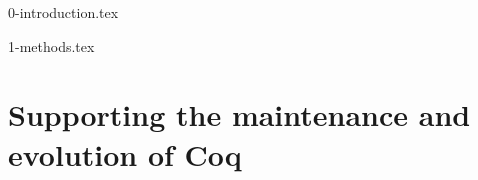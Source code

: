\documentclass[a4paper,11pt,openbib]{memoir} %
\newcommand{\clearemptydoublepage}{\newpage{\thispagestyle{empty}\cleardoublepage}}
\theoremstyle{plain}
\theoremstyle{plain}
\theoremstyle{plain}
\theoremstyle{definition}
\theoremstyle{plain}
\theoremstyle{plain}
\theoremstyle{plain}
\theoremstyle{plain}
\theoremstyle{plain}
\theoremstyle{plain}
\theoremstyle{plain} %
\begin{document}
\raggedbottom %

%
% 
% 
% 
% 
\frontmatter
{}
%

\clearemptydoublepage

%

\clearemptydoublepage
%

\clearemptydoublepage
%


\renewcommand{\contentsname}{Table of Contents}
\tableofcontents*
{}
%

\iffalse
\listoftables
\addtocontents{lot}{\par\nobreak\textbf{{\scshape Table} \hfill Page}\par\nobreak}
\clearemptydoublepage
\listoffigures
\addtocontents{lof}{\par\nobreak\textbf{{\scshape Figure} \hfill Page}\par\nobreak}
\clearemptydoublepage
\fi
%
%
\mainmatter
%


{0-introduction.tex}

{1-methods.tex}

\part{
	Supporting the maintenance and evolution of Coq
}
\end{document}
